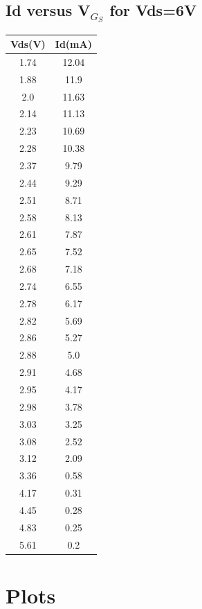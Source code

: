 \subsection{Id versus V$_G_S$ for Vds=6V}
\begin{center}
 \begin{tabular}{|| c | c||} 
 \hline
 Vds(V) & Id(mA) \\ [0.5ex] 
 \hline\hline
 1.74 & 12.04 \\
\hline
1.88 & 11.9 \\
\hline
2.0 & 11.63 \\
\hline
2.14 & 11.13 \\
\hline
2.23 & 10.69 \\
\hline
2.28 & 10.38 \\
\hline
2.37 & 9.79 \\
\hline
2.44 & 9.29 \\
\hline
2.51 & 8.71 \\
\hline
2.58 & 8.13 \\
\hline
2.61 & 7.87 \\
\hline
2.65 & 7.52 \\
\hline
2.68 & 7.18 \\
\hline
2.74 & 6.55 \\
\hline
2.78 & 6.17 \\
\hline
2.82 & 5.69 \\
\hline
2.86 & 5.27 \\
\hline
2.88 & 5.0 \\
\hline
2.91 & 4.68 \\
\hline
2.95 & 4.17 \\
\hline
2.98 & 3.78 \\
\hline
3.03 & 3.25 \\
\hline
3.08 & 2.52 \\
\hline
3.12 & 2.09 \\
\hline
3.36 & 0.58 \\
\hline
4.17 & 0.31 \\
\hline
4.45 & 0.28 \\
\hline
4.83 & 0.25 \\
\hline
5.61 & 0.2 \\
\hline

 


\end{tabular}
\end{center}
 
 
 

\section*{Plots}

